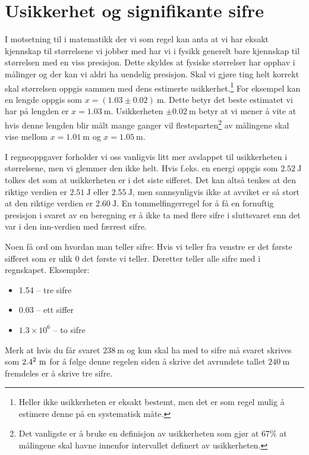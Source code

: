 \chapter{Usikkerhet og signifikante sifre}
I motsetning til i matematikk der vi som regel kan anta at vi har eksakt kjennskap til størrelsene vi jobber med har vi i fysikk generelt bare kjennskap til størrelsen med en viss presisjon. Dette skyldes at fysiske størrelser har opphav i målinger og der kan vi aldri ha uendelig presisjon. Skal vi gjøre ting helt korrekt skal størrelsen oppgis sammen med dens estimerte usikkerhet.\footnote{Heller ikke usikkerheten er eksakt bestemt, men det er som regel mulig å estimere denne på en systematisk måte.
} For eksempel kan en lengde oppgis som $x=(1.03\pm0.02)~\mathrm{m}$. Dette betyr det beste estimatet vi har på lengden er $x = 1.03~\mathrm{m}$. Usikkerheten $\pm0.02~\mathrm{m}$ betyr at vi mener å vite at hvis denne lengden blir målt mange ganger vil flesteparten\footnote{Det vanligste er å bruke en definisjon av usikkerheten som gjør at 67\% at målingene skal havne innenfor intervallet definert av usikkerheten.} av målingene skal vise mellom $x=1.01~\mathrm{m}$ og $x=1.05~\mathrm{m}$. 

I regneoppgaver forholder vi oss vanligvis litt mer avslappet til usikkerheten i størrelsene, men vi glemmer den ikke helt. Hvis f.eks. en energi oppgis som $2.52~\mathrm{J}$ tolkes det som at usikkerheten er i det siste sifferet. Det kan altså tenkes at den riktige verdien er $2.51~\mathrm{J}$ eller $2.55~\mathrm{J}$, men sannsynligvis ikke at avviket er så stort at den riktige verdien er $2.60~\mathrm{J}$. En tommelfingerregel for å få en fornuftig presisjon i svaret av en beregning er å ikke ta med flere sifre i sluttsvaret enn det var i den inn-verdien med færrest sifre.

Noen få ord om hvordan man teller sifre: Hvis vi teller fra venstre er det første sifferet som er ulik 0 det første vi teller. Deretter teller alle sifre med i regnskapet. Eksempler:
\begin{itemize}
	\item 1.54 -- tre sifre
	\item 0.03 -- ett siffer
	\item$1.3\times10^6$ -- to sifre
\end{itemize}
Merk at hvis du får svaret $238~\mathrm{m}$ og kun skal ha med to sifre må svaret skrives som $2.4\time10^2~\mathrm{m}$ for å følge denne regelen siden å skrive det avrundete tallet $240~\mathrm{m}$ fremdeles er å skrive tre sifre.

